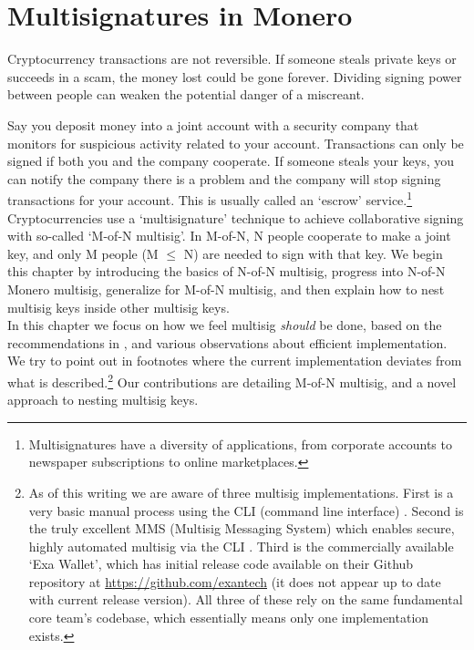 \chapter{Multisignatures in Monero}
\label{chapter:multisignatures}

Cryptocurrency transactions are not reversible. If someone steals private keys or succeeds in a scam, the money lost could be gone forever. Dividing signing power between people can weaken the potential danger of a miscreant.

Say you deposit money into a joint account with a security company that monitors for suspicious activity related to your account. Transactions can only be signed if both you and the company cooperate. If someone steals your keys, you can notify the company there is a problem and the company will stop signing transactions for your account. This is usually called an `escrow' service.\footnote{Multisignatures have a diversity of applications, from corporate accounts to newspaper subscriptions to online marketplaces.}\\

Cryptocurrencies use a `multisignature' technique to achieve collaborative signing with so-called `M-of-N multisig'. In M-of-N, N people cooperate to make a joint key, and only M people (M $\leq$ N) are needed to sign with that key. We begin this chapter by introducing the basics of N-of-N multisig, progress into N-of-N Monero multisig, generalize for M-of-N multisig, and then explain how to nest multisig keys inside other multisig keys.\\

In this chapter we focus on how we feel multisig {\em should} be done, based on the recommendations in \cite{MRL-0009-multisig}, and various observations about efficient implementation. We try to point out in footnotes where the current implementation deviates from what is described.\footnote{As of this writing we are aware of three multisig implementations. First is a very basic manual process using the CLI (command line interface) \cite{cli-22multisig-instructions}. Second is the truly excellent MMS (Multisig Messaging System) which enables secure, highly automated multisig via the CLI \cite{mms-manual, mms-project-proposal}. Third is the commercially available `Exa Wallet', which has initial release code available on their Github repository at \url{https://github.com/exantech} (it does not appear up to date with current release version). All three of these rely on the same fundamental core team's codebase, which essentially means only one implementation exists.} Our contributions are detailing M-of-N multisig, and a novel approach to nesting multisig keys.



